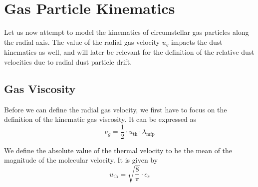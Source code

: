 




    \clearpage\section{Gas Particle Kinematics}

    Let us now attempt to model the kinematics of circumstellar gas particles along the radial 
    axis. The value of the radial gas velocity $u_g$ impacts the dust kinematics as well, and will
    later be relevant for the definition of the relative dust velocities due to radial dust 
    particle drift.


    \subsection{Gas Viscosity}

        Before we can define the radial gas velocity, we first have to 
        focus on the definition of the kinematic gas viscosity.
        It can be expressed as
        \begin{equation}
            \nu_g = \frac{1}{2} \cdot u_\text{th} \cdot \lambda_\text{mfp}
        \end{equation}

        We define the absolute value of the thermal velocity to be the mean of the magnitude
        of the molecular velocity. It is given by
        \begin{equation}
            u_\text{th} = \sqrt{\frac{8}{\pi}} \cdot c_s
        \end{equation}

